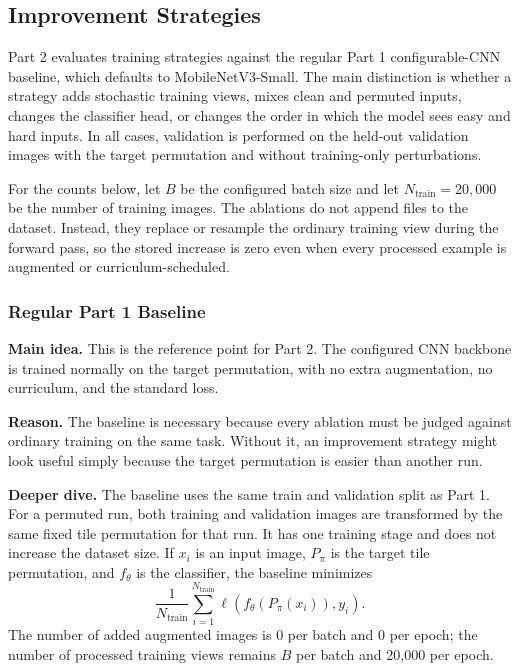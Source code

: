 \documentclass[12pt]{article}
\begin{document}
\subsection{Improvement Strategies}

Part 2 evaluates training strategies against the regular Part 1 configurable-CNN baseline, which defaults to MobileNetV3-Small. The main distinction is whether a strategy adds stochastic training views, mixes clean and permuted inputs, changes the classifier head, or changes the order in which the model sees easy and hard inputs. In all cases, validation is performed on the held-out validation images with the target permutation and without training-only perturbations.

For the counts below, let $B$ be the configured batch size and let $N_{\mathrm{train}}=20{,}000$ be the number of training images. The ablations do not append files to the dataset. Instead, they replace or resample the ordinary training view during the forward pass, so the stored increase is zero even when every processed example is augmented or curriculum-scheduled.

\subsubsection{Regular Part 1 Baseline}

\textbf{Main idea.} This is the reference point for Part 2. The configured CNN backbone is trained normally on the target permutation, with no extra augmentation, no curriculum, and the standard loss.

\textbf{Reason.} The baseline is necessary because every ablation must be judged against ordinary training on the same task. Without it, an improvement strategy might look useful simply because the target permutation is easier than another run.

\textbf{Deeper dive.} The baseline uses the same train and validation split as Part 1. For a permuted run, both training and validation images are transformed by the same fixed tile permutation for that run. It has one training stage and does not increase the dataset size. If $x_i$ is an input image, $P_{\pi}$ is the target tile permutation, and $f_{\theta}$ is the classifier, the baseline minimizes
\[
  \frac{1}{N_{\mathrm{train}}}\sum_{i=1}^{N_{\mathrm{train}}}
  \ell\!\left(f_{\theta}(P_{\pi}(x_i)), y_i\right).
\]
The number of added augmented images is $0$ per batch and $0$ per epoch; the number of processed training views remains $B$ per batch and 20,000 per epoch.
\end{document}
